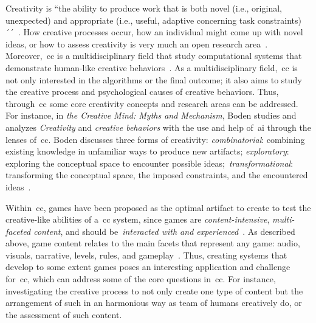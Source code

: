 
Creativity is ``the ability to produce work that is both novel (i.e., original, unexpected) and appropriate (i.e., useful, adaptive concerning task constraints)´´~\cite{Sternberg1999-CreativityConcept}. How creative processes occur, how an individual might come up with novel ideas, or how to assess creativity is very much an open research area~\cite{sternberg1999-handbookCreativity,boden2004-creative,Sternberg2005-creativityCreativities,Csikszentmihalyi97-Creativity}. Moreover,~\acrlong{cc} is a multidisciplinary field that study computational systems that demonstrate human-like creative behaviors~\cite{Colton2012-CC}. As a multidisciplinary field,~\acrshort{cc} is not only interested in the algorithms or the final outcome; it also aims to study the creative process and psychological causes of creative behaviors. Thus, through~\acrshort{cc} some core creativity concepts and research areas can be addressed. For instance, in \textit{the Creative Mind: Myths and Mechanism}, Boden studies and analyzes \emph{Creativity} and \emph{creative behaviors} with the use and help of~\acrshort{ai} through the lenses of~\acrlong{cc}. Boden discusses three forms of creativity: \textit{combinatorial}: combining existing knowledge in unfamiliar ways to produce new artifacts; \textit{exploratory}: exploring the conceptual space to encounter possible ideas;~\textit{transformational}: transforming the conceptual space, the imposed constraints, and the encountered ideas~\cite{boden2004-creative}.

Within~\acrshort{cc}, games have been proposed as the optimal artifact to create to test the creative-like abilities of a~\acrshort{cc} system, since games are \emph{content-intensive}, \emph{multi-faceted content}, and should be~\emph{interacted with and experienced}~\cite{Liapis2014-gameCreativity}. As described above, game content relates to the main facets that represent any game: audio, visuals, narrative, levels, rules, and gameplay~\cite{Liapis2019-OrchestratingGames}. Thus, creating systems that develop to some extent games poses an interesting application and challenge for~\acrshort{cc}, which can address some of the core questions in~\acrshort{cc}. For instance, investigating the creative process to not only create one type of content but the arrangement of such in an harmonious way as team of humans creatively do, or the assessment of such content.

